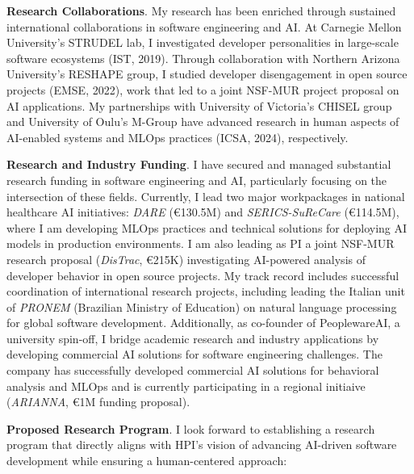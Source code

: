 \textbf{Research Collaborations}.
My research has been enriched through sustained international collaborations in software engineering and AI.
At Carnegie Mellon University's STRUDEL lab, I investigated developer personalities in large-scale software ecosystems (IST, 2019). 
Through collaboration with Northern Arizona University's RESHAPE group, I studied developer disengagement in open source projects (EMSE, 2022), work that led to a joint NSF-MUR project proposal on AI applications.
My partnerships with University of Victoria's CHISEL group and University of Oulu's M-Group have advanced research in human aspects of AI-enabled systems and MLOps practices (ICSA, 2024), respectively.

\textbf{Research and Industry Funding}.
I have secured and managed substantial research funding in software engineering and AI, particularly focusing on the intersection of these fields. Currently, I lead two major workpackages in national healthcare AI initiatives: \textit{DARE} (€130.5M) and \textit{SERICS-SuReCare} (€114.5M), where I am developing MLOps practices and technical solutions for deploying AI models in production environments. I am also leading as PI a joint NSF-MUR research proposal (\textit{DisTrac}, €215K) investigating AI-powered analysis of developer behavior in open source projects.
My track record includes successful coordination of international research projects, including leading the Italian unit of \textit{PRONEM} (Brazilian Ministry of Education) on natural language processing for global software development. 
Additionally, as co-founder of PeoplewareAI, a university spin-off, I bridge academic research and industry applications by developing commercial AI solutions for software engineering challenges. The company has successfully developed commercial AI solutions for behavioral analysis and MLOps and is currently participating in a regional initiaive (\textit{ARIANNA}, €1M funding proposal). 

\textbf{Proposed Research Program}. 
I look forward to establishing a research program that directly aligns with HPI's vision of advancing AI-driven software development while ensuring a human-centered approach:

